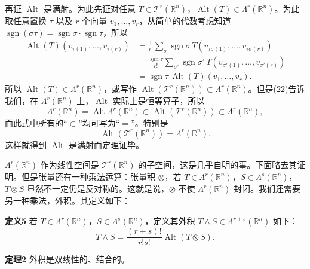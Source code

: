 再证 $\operatorname{Alt}$ 是满射。为此先证对任意 $T\in\mathcal T^r(\mathbb R^n)$，$\operatorname{Alt}(T)\in\Lambda^r(\mathbb R^n)$。为此取任意置换 $\tau$ 以及 $r$ 个向量 $v_1,\ldots,v_r$，从简单的代数考虑知道 $\operatorname{sgn}(\sigma\tau)=\operatorname{sgn}\sigma\cdot\operatorname{sgn}\tau$，所以
\begin{align*}
 \operatorname{Alt}(T)(v_{\tau(1)},\ldots,v_{\tau(r)})
 &=\frac1{r!}\sum_\sigma\operatorname{sgn}\sigma\,
 T(v_{\tau\sigma(1)},\ldots,v_{\tau\sigma(r)})\\
 &=\frac{\operatorname{sgn}\tau}{r!}\sum_{\sigma'}\operatorname{sgn}\sigma'\,
 T(v_{\sigma'(1)},\ldots,v_{\sigma'(r)})\\
 &=\operatorname{sgn}\tau\,\operatorname{Alt}(T)(v_1,\ldots,v_r).
\end{align*}
所以 $\operatorname{Alt}(T)\in\Lambda^r(\mathbb R^n)$，或写作 $\operatorname{Alt}(\mathcal T^r(\mathbb R^n))\subset\Lambda^r(\mathbb R^n)$。但是(22)告诉我们，在 $\Lambda^r(\mathbb R^n)$ 上，$\operatorname{Alt}$ 实际上是恒等算子，所以
\[
 \Lambda^r(\mathbb R^n)=\operatorname{Alt}\Lambda^r(\mathbb R^n)
 \subset \operatorname{Alt}(\mathcal T^r(\mathbb R^n))\subset\Lambda^r(\mathbb R^n),
\]
而此式中所有的“$\subset$”均可写为“$=$”。特别是
\[
 \operatorname{Alt}(\mathcal T^r(\mathbb R^n))=\Lambda^r(\mathbb R^n).
\]
这样就得到 $\operatorname{Alt}$ 是满射而定理证毕。

$\Lambda^r(\mathbb R^n)$ 作为线性空间是 $\mathcal T^r(\mathbb R^n)$ 的子空间，这是几乎自明的事。下面略去其证明。但是张量还有一种乘法运算：张量积 $\otimes$，若 $T\in\Lambda^r(\mathbb R^n)$，$S\in\Lambda^s(\mathbb R^n)$，$T\otimes S$ 显然不一定仍是反对称的。这就是说，$\otimes$ 不使 $\Lambda^r(\mathbb R^n)$ 封闭。我们还需要另一种乘法，外积。其定义如下：

\noindent\textbf{定义5}
若 $T\in\Lambda^r(\mathbb R^n)$，$S\in\Lambda^s(\mathbb R^n)$，定义其外积 $T\wedge S\in\Lambda^{r+s}(\mathbb R^n)$ 如下：
\begin{equation}
 T\wedge S=\frac{(r+s)!}{r!s!}\operatorname{Alt}(T\otimes S).
 \tag{23}
\end{equation}

\noindent\textbf{定理2}
外积是双线性的、结合的。

